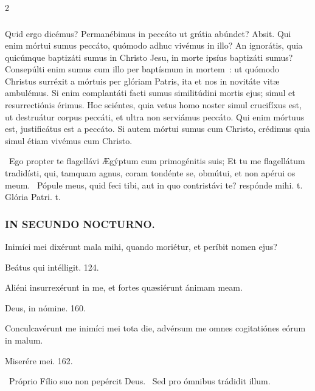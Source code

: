 \documentclass[9pt,twoside]{extarticle}
\begin{document}
\begin{multicols}{2}
{{{\subsubsection*{\center{}}
\lettrine{Q}uid ergo dicémus? Permanébimus in peccáto ut grátia abúndet? Absit. Qui enim mórtui sumus peccáto, quómodo adhuc vivémus in illo? An ignorátis, quia quicúmque baptizáti sumus in Christo Jesu, in morte ipsíus baptizáti sumus? Consepúlti enim sumus cum illo per baptísmum in mortem~: ut quómodo Christus surréxit a mórtuis per glóriam Patris, ita et nos in novitáte vitæ ambulémus. Si enim complantáti facti sumus similitúdini mortis ejus; simul et resurrectiónis érimus. Hoc sciéntes, quia vetus homo noster simul crucifíxus est, ut destruátur corpus peccáti, et ultra non serviámus peccáto. Qui enim mórtuus est, justificátus est a peccáto. Si autem mórtui sumus cum Christo, crédimus quia simul étiam vivémus cum Christo.

\begin{tightlist}{}
\item {}~Ego propter te flagellávi Ægýptum cum primogénitis suis; \textred{*} Et tu me flagellátum tradidísti, qui, tamquam agnus, coram tondénte se, obmútui, et non apérui os meum. ~Pópule meus, quid feci tibi, aut in quo contristávi te? respónde mihi. t.  Glória Patri. t.
\end{tightlist}

\subsubsection*{\center \textsc{IN SECUNDO NOCTURNO.}}
\begin{tightlist}{}
\item {} Inimíci mei dixérunt mala mihi, quando moriétur, et períbit nomen ejus?
\item {} Beátus qui intélligit. 124.
\item {} Aliéni insurrexérunt in me, et fortes quæsiérunt ánimam meam.
\item {} Deus, in nómine. 160.
\item {} Conculcavérunt me inimíci mei tota die, advérsum me omnes cogitatiónes eórum in malum.
\item {} Miserére mei. 162.
\item {}~Próprio Fílio suo non pepércit Deus. ~Sed pro ómnibus trádidit illum.
\end{tightlist}

}}}
\end{multicols}
\end{document}
